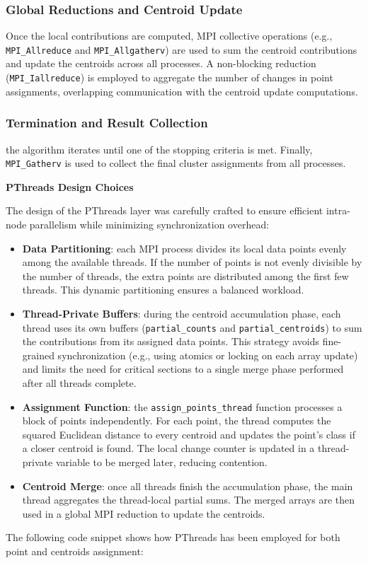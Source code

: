 \documentclass[11pt, journal]{IEEEtran}
\newcommand{\nwl}{

\vspace{11pt}

}
\begin{document}
\subsubsection{Global Reductions and Centroid Update} Once the local contributions are computed, MPI collective operations (e.g., \texttt{MPI\_Allreduce} and \texttt{MPI\_Allgatherv}) are used to sum the centroid contributions and update the centroids across all processes. A non-blocking reduction (\texttt{MPI\_Iallreduce}) is employed to aggregate the number of changes in point assignments, overlapping communication with the centroid update computations.
\nwl
\subsubsection{Termination and Result Collection} the algorithm iterates until one of the stopping criteria is met. Finally, \texttt{MPI\_Gatherv} is used to collect the final cluster assignments from all processes.
\nwl
\noindent \textbf{PThreads Design Choices}

The design of the PThreads layer was carefully crafted to ensure efficient intra-node parallelism while minimizing synchronization overhead:

\begin{itemize}
    \item \textbf{Data Partitioning}: each MPI process divides its local data points evenly among the available threads. If the number of points is not evenly divisible by the number of threads, the extra points are distributed among the first few threads. This dynamic partitioning ensures a balanced workload.
    
    \item \textbf{Thread-Private Buffers}: during the centroid accumulation phase, each thread uses its own buffers (\texttt{partial\_counts} and \texttt{partial\_centroids}) to sum the contributions from its assigned data points. This strategy avoids fine-grained synchronization (e.g., using atomics or locking on each array update) and limits the need for critical sections to a single merge phase performed after all threads complete.
    
    \item \textbf{Assignment Function}: the \texttt{assign\_points\_thread} function processes a block of points independently. For each point, the thread computes the squared Euclidean distance to every centroid and updates the point's class if a closer centroid is found. The local change counter is updated in a thread-private variable to be merged later, reducing contention.
    
    \item \textbf{Centroid Merge}: once all threads finish the accumulation phase, the main thread aggregates the thread-local partial sums. The merged arrays are then used in a global MPI reduction to update the centroids.
\end{itemize}
\nwl
The following code snippet shows how PThreads has been employed for both point and centroids assignment:
\end{document}
